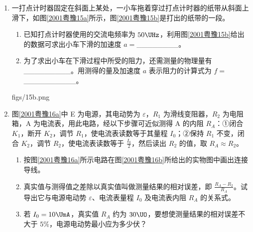 \documentclass[\gkver]{gaokaozhenti}
\begin{document}
\begin{enumerate}
\item
一打点计时器固定在斜面上某处，一小车拖着穿过打点计时器的纸带从斜面上滑下，如图\ref{2001粤豫15a}所示，图\ref{2001粤豫15b}是打出的纸带的一段。

\begin{enumerate}
	\item
	已知打点计时器使用的交流电频率为 $50\UHz$，利用图\ref{2001粤豫15b}给出的数据可求出小车下滑的加速度 $a = $\_\_\_\_\_\_\_\_。
	\item
	为了求出小车在下滑过程中所受的阻力，还需测量的物理量有\_\_\_\_\_\_\_\_\_。用测得的量及加速度 $a$ 表示阻力的计算式为 $f = $\_\_\_\_\_\_\_\_\_\_。
\end{enumerate}

{figs/15b.png}

\item
图\ref{2001粤豫16a}中 E 为电源，其电动势为 $\varepsilon$，$R_{1}$ 为滑线变阻器，$R_{2}$ 为电阻箱，A 为电流表，用此电路，经以下步骤可近似测得 A 的内阻 $R_{A}$：①闭合 $K_{1}$，断开 $K_{2}$，调节 $R_{1}$，使电流表读数等于其量程 $I_{0}$；②保持 $R_{1}$ 不变，闭合 $K_{2}$，调节 $R_{2}$，使电流表读数等于 $\frac{I_{0}}{2}$，然后读出 $R_{2}$ 的值，取 $R_{A}\approx R_{2}$。

\begin{enumerate}
	\item
	按图\ref{2001粤豫16a}所示电路在图\ref{2001粤豫16b}所给出的实物图中画出连接导线。
	\item
	真实值与测得值之差除以真实值叫做测量结果的相对误差，即 $\frac{R_{A}-R_{2}}{R_{A}}$。试导出它与电源电动势 $\varepsilon$、电流表量程 $I_{0}$ 及电流表内阻 $R_{A}$ 的关系式。
	\item
	若 $I_{0}=10\UmA$，真实值 $R_{A}$ 约为 $30\UO$，要想使测量结果的相对误差不大于 $5\%$，电源电动势最小应为多少伏？
\end{enumerate}


\end{enumerate}
\end{document}
